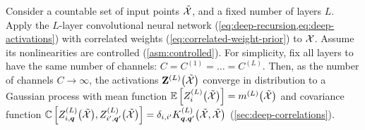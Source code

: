 \documentclass[accepted]{uai2021} %
\newcommand{\layerAsm}[3]{Z^{(#1)}_{#2}\bra{#3}}
\newcommand{\layerAm}[3]{\mathbf{Z}^{(#1)}_{#2}\bra{#3}}
\newcommand{\layerC}[1]{C^{(#1)}}
\newcommand{\chan}{i}
\newcommand{\nextpatch}{\vq}
\newcommand{\meanf}[1]{m\ssup{#1}}
\newcommand{\covf}[1]{K\ssup{#1}}
\newcommand{\0}{\boldsymbol{0}}
\newcommand{\1}{\boldsymbol{1}}
\newcommand{\crefp}[1]{(\cref{#1})}
\begin{document}
\begin{theorem}
  Consider a countable set of input points $\tilde{{\mathcal{X}}}$, and a fixed number of
  layers $L$. Apply the $L$-layer convolutional neural network \crefp{eq:deep-recursion,eq:deep-activations}
  with correlated weights \crefp{eq:correlated-weight-prior} to ${\mathcal{X}}$. Assume its
  nonlinearities are controlled \crefp{asm:controlled}.
  For simplicity, fix all layers to have
  the same number of channels: $C = \layerC{1} = \dots = \layerC{L}$. Then, as the number of channels $C \to \infty$, the activations $\layerAm{L}{}{\tilde\gX}$ converge in distribution to a Gaussian process with mean function $\E\sqb{\layerAsm{L}{\chan}{\tilde\gX}} = \meanf{L}\bra{\tilde{\gX}}$ and covariance function $\Cov\sqb{\layerAsm{L}{\chan,\nextpatch}{\tilde\gX}, \layerAsm{L}{\chan',\nextpatch'}{\tilde{\gX}}} =
  \delta_{\chan,\chan'}\covf{L}_{\nextpatch,\nextpatch'}\bra{\tilde\gX,\tilde\gX}$ \crefp{sec:deep-correlations}.
\label{thm:correlated-cnn-gp}
\end{theorem}
\end{document}
